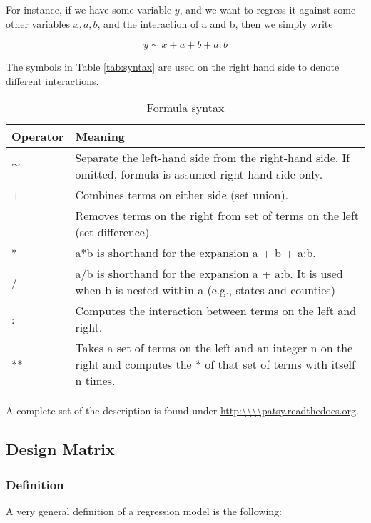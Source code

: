 For instance, if we have some variable $y$, and we want to regress it against some other variables $x, a, b$, and the interaction of a and b, then we simply write

\begin{equation}
    y \sim x + a + b + a:b
\end{equation}

The symbols in Table \ref{tab:syntax} are used on the right hand side to denote different interactions.

\begin{table}
  \centering
  \footnotesize{
  \begin{tabular}{ p{2cm} p{9cm} }
     Operator & Meaning \\
     \hline
    $\sim $ &	Separate the left-hand side from the right-hand side. If omitted, formula is assumed right-hand side only. \\
    + &	Combines terms on either side (set union). \\
    - &	Removes terms on the right from set of terms on the left (set difference). \\
    * &	a*b is shorthand for the expansion a + b + a:b. \\
    / &	a/b is shorthand for the expansion a + a:b. It is used when b is nested within a (e.g., states and counties) \\
    : &	Computes the interaction between terms on the left and right. \\
    ** & Takes a set of terms on the left and an integer n on the right and computes the * of that set of terms with itself n times.\\
     \hline
  \end{tabular}
  }
  \caption{Formula syntax}
\end{table}\label{tab:syntax}

A complete set of the description is found under \url{http:\\\\patsy.readthedocs.org}.

\subsection{Design Matrix}

\subsubsection{Definition}
A very general definition of a regression model is the following:

